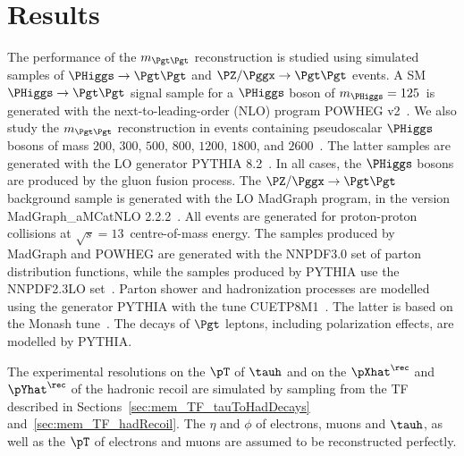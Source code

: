 \section{Results}
\label{sec:results}

The performance of the $m_{\Pgt\Pgt}$ reconstruction is studied using
simulated samples of $\PHiggs \to \Pgt\Pgt$ and $\PZ/\Pggx \to
\Pgt\Pgt$ events.
A SM $\PHiggs \to \Pgt\Pgt$ signal sample for a $\PHiggs$ boson of $m_{\PHiggs} = 125$~\GeV is generated with the next-to-leading-order (NLO) program POWHEG v2~\cite{POWHEG1,POWHEG2,POWHEG3}.
We also study the $m_{\Pgt\Pgt}$ reconstruction in events containing pseudoscalar $\PHiggs$ bosons of mass $200$, $300$, $500$, $800$, $1200$, $1800$, and $2600$~\GeV.
The latter samples are generated with the LO generator PYTHIA 8.2~\cite{pythia8}.
In all cases, the $\PHiggs$ bosons are produced by the gluon fusion process.
The $\PZ/\Pggx \to \Pgt\Pgt$ background sample is generated with the LO MadGraph program, in the version MadGraph\_aMCatNLO 2.2.2~\cite{MadGraph_aMCatNLO}.
All events are generated for proton-proton collisions at $\sqrt{s} = 13$~\TeV centre-of-mass energy.
The samples produced by MadGraph and POWHEG are generated with the NNPDF3.0 set of parton distribution functions,
while the samples produced by PYTHIA use the NNPDF2.3LO set~\cite{NNPDF1,NNPDF2,NNPDF3}.
Parton shower and hadronization processes are modelled using the generator PYTHIA with the tune CUETP8M1~\cite{PYTHIA_CUETP8M1tune_CMS}.
The latter is based on the Monash tune~\cite{PYTHIA_MonashTune}.
The decays of $\Pgt$ leptons, including polarization effects, are modelled by PYTHIA.

The experimental resolutions on the $\pT$ of $\tauh$ and on the $\pXhat^{\rec}$ and $\pYhat^{\rec}$ of the hadronic recoil 
are simulated by sampling from the TF described in
Sections~\ref{sec:mem_TF_tauToHadDecays}
and~\ref{sec:mem_TF_hadRecoil}.
The $\eta$ and $\phi$ of electrons, muons and $\tauh$,
as well as the $\pT$ of electrons and muons are assumed to be reconstructed perfectly.

